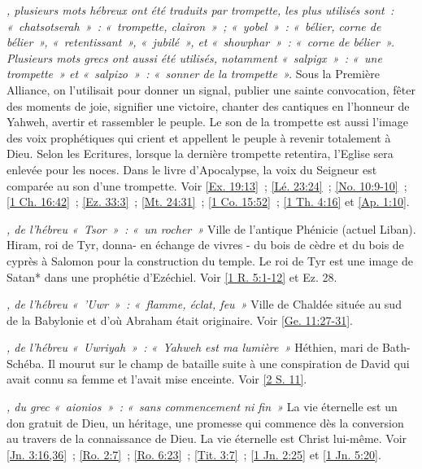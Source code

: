 \begin{multicols}{2}
\textit{, plusieurs mots hébreux ont été traduits par trompette, les plus utilisés sont~: «~chatsotserah~»~: «~trompette, clairon~»~; «~yobel~»~: «~bélier, corne de bélier~», «~retentissant~», «~jubilé~», et «~showphar~»~: «~corne de bélier~». Plusieurs mots grecs ont aussi été utilisés, notamment «~salpigx~»~: «~une trompette~» et «~salpizo~»~: «~sonner de la trompette~».}\newline
Sous la Première Alliance, on l'utilisait pour donner un signal, publier une sainte convocation, fêter des moments de joie, signifier une victoire, chanter des cantiques en l'honneur de Yahweh, avertir et rassembler le peuple. Le son de la trompette est aussi l'image des voix prophétiques qui crient et appellent le peuple à revenir totalement à Dieu. Selon les Ecritures, lorsque la dernière trompette retentira, l'Eglise sera enlevée pour les noces. Dans le livre d'Apocalypse, la voix du Seigneur est comparée au son d'une trompette. Voir \vref{Ex. 19:13}~; \vref{Lé. 23:24}~; \vref{No. 10:9-10}~; \vref{1 Ch. 16:42}~; \vref{Ez. 33:3}~; \vref{Mt. 24:31}~; \vref{1 Co. 15:52}~; \vref{1 Th. 4:16} et \vref{Ap. 1:10}.

\textit{, de l'hébreu «~Tsor~»~: «~un rocher~»}\newline
Ville de l'antique Phénicie (actuel Liban). Hiram, roi de Tyr, donna- en échange de vivres - du bois de cèdre et du bois de cyprès à Salomon pour la construction du temple. Le roi de Tyr est une image de Satan* dans une prophétie d'Ezéchiel. Voir \vref{1 R. 5:1-12} et Ez. 28.

\textit{, de l'hébreu «~'Uwr~»~: «~flamme, éclat, feu~»}\newline
Ville de Chaldée située au sud de la Babylonie et d'où Abraham était originaire. Voir \vref{Ge. 11:27-31}.

\textit{, de l'hébreu «~Uwriyah~»~: «~Yahweh est ma lumière~»}\newline
Héthien, mari de Bath-Schéba. Il mourut sur le champ de bataille suite à une conspiration de David qui avait connu sa femme et l'avait mise enceinte. Voir \vref{2 S. 11}.

\textit{, du grec «~aionios~»~: «~sans commencement ni fin~»}\newline
La vie éternelle est un don gratuit de Dieu, un héritage, une promesse qui commence dès la conversion au travers de la connaissance de Dieu. La vie éternelle est Christ lui-même. Voir \vref{Jn. 3:16,36}~; \vref{Ro. 2:7}~; \vref{Ro. 6:23}~; \vref{Tit. 3:7}~; \vref{1 Jn. 2:25} et \vref{1 Jn. 5:20}.


\end{multicols}
